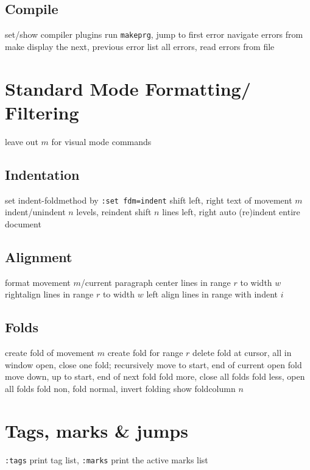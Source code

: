 \subsection{Compile}	{}
	{set/show compiler plugins}
	{run {\tt makeprg}, jump to first error}
	{navigate errors from make}
	{display the next, previous error}
	{list all errors, read errors from file}

\section{Standard Mode Formatting/ Filtering}	{leave out $m$ for visual mode commands}

\subsection{Indentation}{set indent-foldmethod by {\tt :set fdm=indent}}
	{shift left, right text of movement $m$}
	{indent/unindent $n$ levels, reindent}
	{shift $n$ lines left, right}
	{auto (re)indent entire document}

\subsection{Alignment}{}
	{format movement $m$/current paragraph}
	{center lines in range $r$ to width $w$}
	{rightalign lines in range $r$ to width $w$}
	{left align lines in range with indent $i$}

\subsection{Folds}	{}
	{create fold of movement $m$}
	{create fold for range $r$}
	{delete fold at cursor, all in window}
	{open, close one fold; recursively}
	{move to start, end of current open fold}
	{move down, up to start, end of next fold}
	{fold more, close all folds}
	{fold less, open all folds}
	{fold non, fold normal, invert folding}
	{show foldcolumn $n$}

\section{Tags, marks \& jumps}{{\tt :tags} print tag list, {\tt :marks} print the active marks list}
